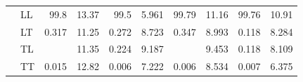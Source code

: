 \begin{table}[h]
{\begin{tabular}{llrrrrrrrr}
 & LL & \num{99.8} & \num{13.37} & \num{99.5} & \num{5.961} & \num{99.79} & \num{11.16} & \num{99.76} & \num{10.91} \\
 & LT & \num{0.317} & \num{11.25} & \num{0.272} & \num{8.723} & \num{0.347} & \num{8.993} & \num{0.118} & \num{8.284} \\
 & TL &  & \num{11.35} & \num{0.224} & \num{9.187} &  & \num{9.453} & \num{0.118} & \num{8.109} \\
 & TT & \num{0.015} & \num{12.82} & \num{0.006} & \num{7.222} & \num{0.006} & \num{8.534} & \num{0.007} & \num{6.375} \\
\bottomrule
\end{tabular}
}%
\end{table}